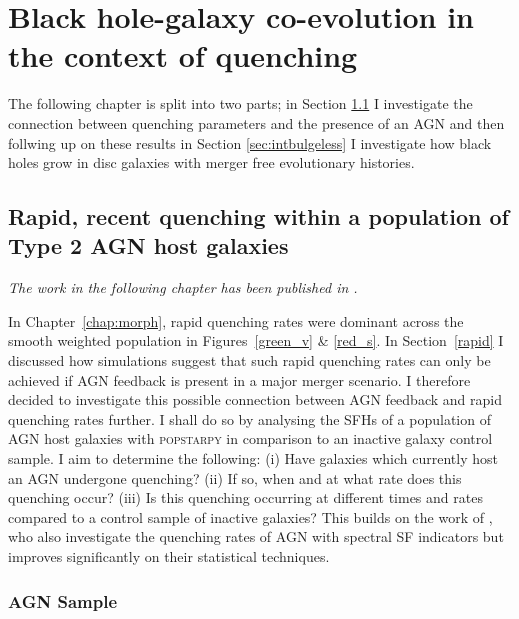 
\chapter{Black hole-galaxy co-evolution in the context of quenching}\label{chap:agn}

The following chapter is split into two parts; in Section \ref{sec:agnfeedback} I investigate the connection between quenching parameters and the presence of an AGN and then follwing up on these results in Section \ref{sec:intbulgeless} I investigate how black holes grow in disc galaxies with merger free evolutionary histories. 

\section{Rapid, recent quenching within a population of Type 2 AGN host galaxies}\label{sec:agnfeedback}

\emph{The work in the following chapter has been published in \citet{smethurst16}.}

In Chapter~\ref{chap:morph}, rapid quenching rates were dominant across the smooth weighted population in Figures~\ref{green_v} \& \ref{red_s}. In Section~\ref{rapid} I discussed how simulations suggest that such rapid quenching rates can only be achieved if AGN feedback is present in a major merger scenario. I therefore decided to investigate this possible connection between AGN feedback and rapid quenching rates further. I shall do so by analysing the SFHs of a population of AGN host galaxies with \textsc{popstarpy} in comparison to an inactive galaxy control sample. I  aim to determine the following: (i) Have galaxies which currently host an AGN undergone quenching? (ii) If so, when and at what rate does this quenching occur? (iii) Is this quenching occurring at different times and rates compared to a control sample of inactive galaxies? This builds on the work of \citet{Martin07}, who also investigate the quenching rates of AGN with spectral SF indicators but improves significantly on their statistical techniques.

\subsection{AGN Sample}\label{agnsample}

